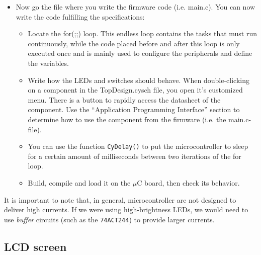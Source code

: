 \begin{itemize}
	\item Now go the file where you write the firmware code (i.e. main.c). You can now write the code fulfilling the specifications: 
	\begin{itemize}
		\item Locate the for(;;) loop.
        This endless loop contains the tasks that must run continuously, while the code placed before and after this loop is only executed once and is mainly used to configure the peripherals and define the variables.
		\item Write how the LEDs and switches should behave. When double-clicking on a component in the TopDesign.cysch file, you open it's customized menu. There is a button to rapidly access the datasheet of the component. Use the ``Application Programming Interface'' section to determine how to use the component from the firmware (i.e. the main.c-file). 
		\item You can use the function \texttt{CyDelay()} to put the microcontroller to sleep for a certain amount of milliseconds between two iterations of the for loop. 
		\item Build, compile and load it on the $\mu$C board, then check its behavior.
	\end{itemize}
\end{itemize}
It is important to note that, in general, microcontroller are not designed to deliver high currents. If we were using high-brightness LEDs, we would need to use \textit{buffer} circuits (such as the \texttt{74ACT244}) to provide larger currents. 






\newpage
\subsection{LCD screen}

